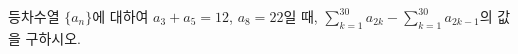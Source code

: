 등차수열 $\{a_n\}$에 대하여 $a_3+a_5=12$, $a_8=22$일 때, $\displaystyle\sum_{k=1}^{30} a_{2k}-\sum_{k=1}^{30} a_{2k-1}$의 값을 구하시오.
